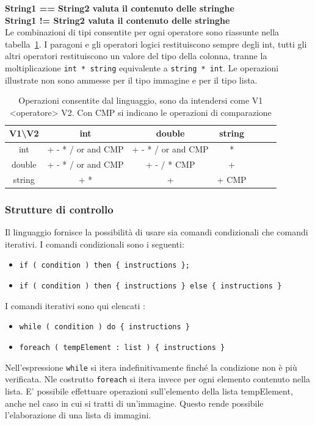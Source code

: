 \documentclass[10pt]{article}
\begin{document}
\textbf{String1 == String2 valuta il contenuto delle stringhe}\\
\textbf{String1 != String2 valuta il contenuto delle stringhe}\\

Le combinazioni di tipi consentite per ogni operatore sono riassunte nella tabella~\ref{table:operatori}. I paragoni e gli operatori logici restituiscono sempre degli int, tutti gli altri operatori restituiscono un valore del tipo della colonna, tranne la moltiplicazione \texttt{int * string} equivalente a \texttt{string * int}. Le operazioni illustrate non sono ammesse per il tipo immagine e per il tipo lista.\\



\begin{table}
	\centering
	\begin{tabular}{|c|c|c|c|c|c|c|}
		\hline
		V1\textbackslash V2   &        int            &    double             &  string       \\ \hline
		int                    &  + - * / or and CMP   &  + - * / or and CMP   &    *          \\ \hline
		double       			& + - * / or and CMP    & + - / * CMP   		&     +         \\ \hline
		string        		     &        + *             &         +      	     & +    CMP      \\ \hline
	\end{tabular}
	\caption{Operazioni consentite dal linguaggio, sono da intendersi come V1 <operatore> V2. Con CMP si indicano le operazioni di comparazione}
	\label{table:operatori}
\end{table}
\newpage
\subsubsection{Strutture di controllo}
Il linguaggio fornisce la possibilità di usare sia comandi condizionali che comandi iterativi. I comandi condizionali sono i seguenti:
\begin{itemize}
	\item \texttt{if ( condition ) then \{ instructions \};}
	\item \texttt{if ( condition ) then \{ instructions \} else \{ instructions \}}
\end{itemize}
I comandi iterativi sono qui elencati :
\begin{itemize}
	\item \texttt{while ( condition ) do \{ instructions \}}
	\item \texttt{foreach ( tempElement : list ) \{ instructions \} }
\end{itemize}
Nell'espressione \texttt{while} si itera indefinitivamente finché la condizione non è più verificata. Nle costrutto \texttt{foreach} si itera invece per ogni elemento contenuto nella lista. E' possibile effettuare operazioni sull'elemento della lista tempElement, anche nel caso in cui si tratti di un'immagine. Questo rende possibile l'elaborazione di una lista di immagini.\\
\end{document}
